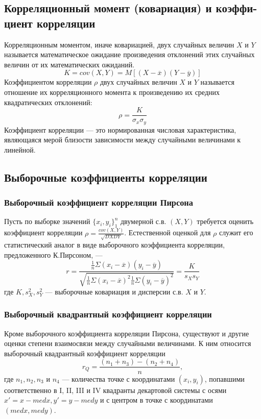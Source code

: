\subsection{Корреляционный момент (ковариация) и коэффи-
циент корреляции}
Корреляционным моментом, иначе ковариацией, двух случайных величин $X$ и $Y$ называется математическое ожидание произведения отклонений этих случайных величин от их математических ожиданий.
\begin{equation}
K=cov(X,Y)=M[(X-\overline{x})(Y-\overline{y})]
\end{equation}
Коэффициентом корреляции $\rho$ двух случайных величин $X$ и $Y$ называется отношение их корреляционного момента к произведению их средних квадратических отклонений:
\begin{equation}
\rho=\frac{K}{\sigma_x \sigma_y}
\end{equation}
Коэффициент корреляции — это нормированная числовая характеристика, являющаяся мерой близости зависимости между случайными величинами к линейной.

\subsection{Выборочные коэффициенты корреляции}
\subsubsection{Выборочный коэффициент корреляции Пирсона}
Пусть по выборке значений $\{x_i,y_i\}_1^n$ двумерной с.в. $(X,Y)$ требуется оценить коэффициент корреляции $\rho=\frac{cov(X,Y)}{\sqrt{DX DY}}$. Естественной оценкой для $\rho$ служит его статистический аналог в виде выборочного коэффициента корреляции, предложенного К.Пирсоном, —
\begin{equation}
r=\frac{\frac{1}{n}\Sigma (x_i-\overline{x})(y_i-\overline{y})}{\sqrt{\frac{1}{n}\Sigma (x_i-\overline{x})^2 \frac{1}{n}\Sigma (y_i-\overline{y})^2}}=\frac{K}{s_X s_Y}
\end{equation}
где $K,s_X^2,s_Y^2$ — выборочные ковариация и дисперсии с.в. $X$ и $Y$.

\subsubsection{Выборочный квадрантный коэффициент корреляции}
Кроме выборочного коэффициента корреляции Пирсона, существуют и другие оценки степени взаимосвязи между случайными величинами. К ним относится выборочный квадрантный коэффициент корреляции
\begin{equation}
r_Q=\frac{(n_1+n_3)-(n_2+n_4)}{n},
\end{equation}
где $n_1, n_2, n_3$ и $n_4$ — количества точке с координатами $(x_i, y_i)$, попавшими соответственно в I, II, III и IV квадранты декартовой системы с осями $x'=x-med x, y'=y-med y$ и с центром в точке с координатами $(med x, med y)$.

